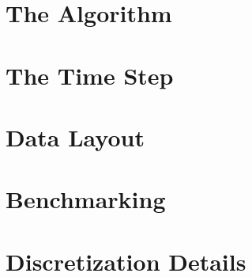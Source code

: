 \documentclass[11pt,a4paper]{article}
\begin{document}
\clearpage
\section{The Algorithm}


\clearpage
\section{The Time Step}



\clearpage
\section{Data Layout}
\label{sec:data}


\section{Benchmarking}

\clearpage
\appendix
\section{Discretization Details}
\label{appendix:discretization}

%
\end{document}
